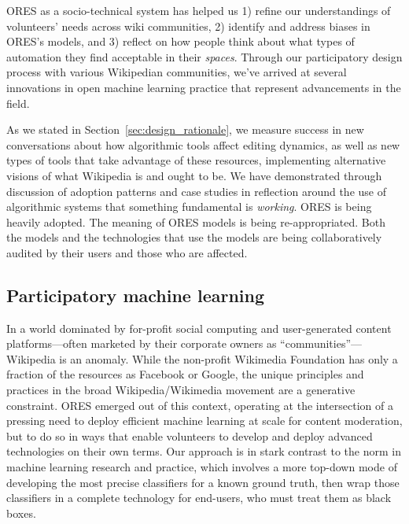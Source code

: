 ORES as a socio-technical system has helped us 1) refine our understandings of volunteers' needs across wiki communities, 2) identify and address biases in ORES's models, and 3) reflect on how people think about what types of automation they find acceptable in their \emph{spaces}.  Through our participatory design process with various Wikipedian communities, we've arrived at several innovations in open machine learning practice that represent advancements in the field.

As we stated in Section~\ref{sec:design_rationale}, we measure success in new conversations about how algorithmic tools affect editing dynamics, as well as new types of tools that take advantage of these resources, implementing alternative visions of what Wikipedia is and ought to be.  We have demonstrated through discussion of adoption patterns and case studies in reflection around the use of algorithmic systems that something fundamental is \emph{working}.  ORES is being heavily adopted.  The meaning of ORES models is being re-appropriated.  Both the models and the technologies that use the models are being collaboratively audited by their users and those who are affected.

\subsection{Participatory machine learning}
In a world dominated by for-profit social computing and user-generated content platforms---often marketed by their corporate owners as ``communities''\cite{gillespie2018custodians}---Wikipedia is an anomaly. While the non-profit Wikimedia Foundation has only a fraction of the resources as Facebook or Google, the unique principles and practices in the broad Wikipedia/Wikimedia movement are a generative constraint. ORES emerged out of this context, operating at the intersection of a pressing need to deploy efficient machine learning at scale for content moderation, but to do so in ways that enable volunteers to develop and deploy advanced technologies on their own terms. Our approach is in stark contrast to the norm in machine learning research and practice, which involves a more top-down mode of developing the most precise classifiers for a known ground truth, then wrap those classifiers in a complete technology for end-users, who must treat them as black boxes.

